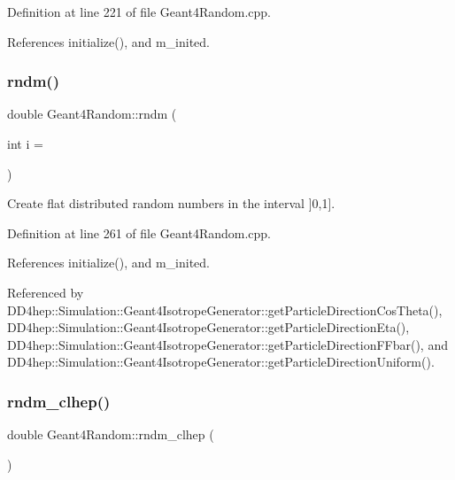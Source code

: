 Definition at line 221 of file Geant4\+Random.\+cpp.



References initialize(), and m\+\_\+inited.

\hypertarget{class_d_d4hep_1_1_simulation_1_1_geant4_random_a4aaab596ee59a7ae5cbee9cbfde250d5}{}\label{class_d_d4hep_1_1_simulation_1_1_geant4_random_a4aaab596ee59a7ae5cbee9cbfde250d5} 
\subsubsection{\texorpdfstring{rndm()}{rndm()}}
{\footnotesize\ttfamily double Geant4\+Random\+::rndm (\begin{DoxyParamCaption}\item[{int}]{i = {} }\end{DoxyParamCaption})}



Create flat distributed random numbers in the interval \mbox{]}0,1\mbox{]}. 



Definition at line 261 of file Geant4\+Random.\+cpp.



References initialize(), and m\+\_\+inited.



Referenced by D\+D4hep\+::\+Simulation\+::\+Geant4\+Isotrope\+Generator\+::get\+Particle\+Direction\+Cos\+Theta(), D\+D4hep\+::\+Simulation\+::\+Geant4\+Isotrope\+Generator\+::get\+Particle\+Direction\+Eta(), D\+D4hep\+::\+Simulation\+::\+Geant4\+Isotrope\+Generator\+::get\+Particle\+Direction\+F\+Fbar(), and D\+D4hep\+::\+Simulation\+::\+Geant4\+Isotrope\+Generator\+::get\+Particle\+Direction\+Uniform().

\hypertarget{class_d_d4hep_1_1_simulation_1_1_geant4_random_a691d3cc880c5db6fab4699784a8b375c}{}\label{class_d_d4hep_1_1_simulation_1_1_geant4_random_a691d3cc880c5db6fab4699784a8b375c} 
\subsubsection{\texorpdfstring{rndm\+\_\+clhep()}{rndm\_clhep()}}
{\footnotesize\ttfamily double Geant4\+Random\+::rndm\+\_\+clhep (\begin{DoxyParamCaption}{ }\end{DoxyParamCaption})}



